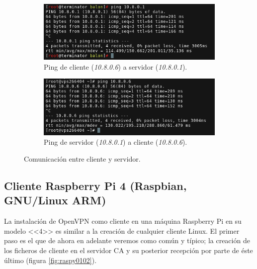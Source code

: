 \documentclass[a4paper, 11pt, titlepage]{article}
\begin{document}
        \begin{figure}[htp]
        \centering
            \begin{subfigure}[b]{1\linewidth}
            \includegraphics[width=1\textwidth]{resources/openvpn16.png}
            \caption{Ping de cliente (\textit{10.8.0.6}) a servidor (\textit{10.8.0.1}).}
            \end{subfigure}

            \begin{subfigure}[b]{1\linewidth}
            \includegraphics[width=1\textwidth]{resources/openvpn17.png}
            \caption{Ping de servidor (\textit{10.8.0.1}) a cliente (\textit{10.8.0.6}).}
            \end{subfigure}
        \caption{Comunicación entre cliente y servidor.}
        \label{fig:openvpn1617}
        \end{figure}

    \newpage
    \newpage
    \subsection{Cliente Raspberry Pi 4 (Raspbian, GNU/Linux ARM)}

        La instalación de OpenVPN como cliente en una máquina Raspberry Pi en su modelo <<4>>
        es similar a la creación de cualquier cliente Linux. El primer paso es el que de ahora 
        en adelante veremos como común y típico; la creación de los ficheros de cliente en el
        servidor CA y su posterior recepción por parte de éste último (figura \ref{fig:raspy0102}).
\end{document}
